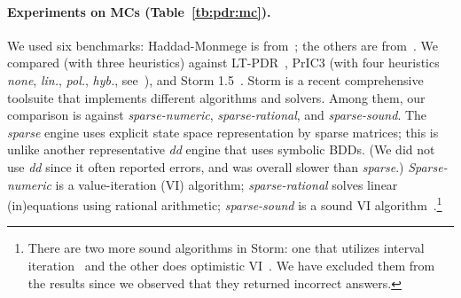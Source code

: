 \paragraph{Experiments on MCs (Table~\ref{tb:pdr:mc}).}
We used six benchmarks: Haddad\hyp{}Monmege is from~\cite{HKPQR19}; the others are from~\cite{BJKKMS20,KUKSH22}. We compared \ADPDR (with three heuristics) against LT-PDR~\cite{KUKSH22}, PrIC3 (with four  heuristics \emph{none}, \emph{lin.}, \emph{pol.}, \emph{hyb.}, see~\cite{BJKKMS20}), and Storm 1.5~\cite{DJK017}. Storm is a recent comprehensive toolsuite that implements different algorithms and solvers. Among them, our comparison is against \emph{sparse-numeric}, \emph{sparse-rational}, and \emph{sparse-sound}.
The \emph{sparse} engine uses explicit state space representation by sparse matrices; this is unlike another representative \emph{dd} engine that uses symbolic BDDs. (We did not use \emph{dd} since it often reported errors, and was overall slower than \emph{sparse}.)
\emph{Sparse-numeric}  is a value-iteration (VI) algorithm;  \emph{sparse-rational}  solves linear (in)equations using rational arithmetic;
\emph{sparse-sound} is a sound VI algorithm~\cite{QK18}.\footnote{There are two more sound algorithms in Storm: one that utilizes interval iteration~\cite{BKLPW17} and the other does optimistic VI~\cite{HK20}. We have excluded them from the results since we observed that they returned incorrect answers.}

